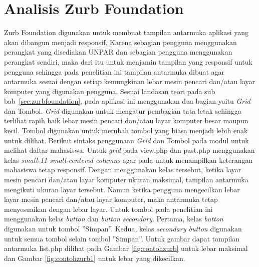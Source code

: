 \section{Analisis Zurb Foundation}
\label{sec:analisisZurbFoundation}
Zurb Foundation digunakan untuk membuat tampilan antarmuka aplikasi yang akan
dibangun menjadi responsif. Karena sebagian pengguna menggunakan perangkat yang disediakan UNPAR dan sebagian pengguna menggunakan perangkat sendiri, maka dari itu untuk menjamin tampilan yang responsif untuk pengguna sehingga pada penelitian ini tampilan antarmuka dibuat agar antarmuka sesuai dengan setiap kemungkinan lebar mesin pencari dan/atau layar komputer yang digunakan pengguna. Sesuai landasan teori pada sub bab~\ref{sec:zurbfoundation}, pada aplikasi ini menggunakan dua bagian yaitu {\it Grid} dan Tombol. {\it Grid} digunakan untuk mengatur pembagian tata letak sehingga terlihat rapih baik lebar mesin pencari dan/atau layar komputer besar maupun kecil. Tombol digunakan untuk merubah tombol yang biasa menjadi lebih enak untuk dilihat. Berikut sintaks penggunaan {\it Grid} dan Tombol pada modul untuk melihat daftar mahasiswa. Untuk {\it grid} pada view.php dan past.php menggunakan kelas {\it small-11 small-centered columns} agar pada untuk menampilkan keterangan mahasiswa tetap responsif. Dengan menggunakan kelas tersebut, ketika layar mesin pencari dan/atau layar komputer ukuran maksimal, tampilan antarmuka mengikuti ukuran layar tersebut. Namun ketika pengguna mengecilkan lebar layar mesin pencari dan/atau layar komputer, maka antarmuka tetap menyesuaikan dengan lebar layar. Untuk tombol pada penelitian ini menggunakan kelas {\it button} dan {\it button secondary}. Pertama, kelas {\it button} digunakan untuk tombol ''Simpan''. Kedua, kelas {\it secondary button} digunakan untuk semua tombol selain tombol ''Simpan''. Untuk gambar dapat tampilan antarmuka list.php dilihat pada Gambar \ref{fig:contohzurb} untuk lebar maksimal dan Gambar \ref{fig:contohzurb1} untuk lebar yang dikecilkan.


